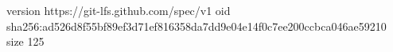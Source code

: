 version https://git-lfs.github.com/spec/v1
oid sha256:ad526d8f55bf89ef3d71ef816358da7dd9e04e14f0c7ee200ccbca046ae59210
size 125
